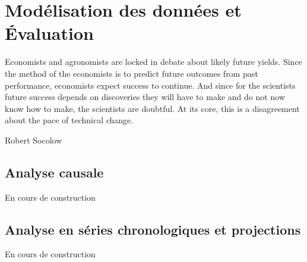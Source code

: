 \chapter{Modélisation des données et Évaluation}
\epigraph{Economists and agronomists are locked in debate about likely
future yields. Since the method of the economists is to predict
future outcomes from past performance, economists expect
success to continue. And since for the scientists future success
depends on discoveries they will have to make and do not now
know how to make, the scientists are doubtful. At its core, this is
a disagreement about the pace of technical change.}{Robert
Socolow}
\cleardoublepage

	\section{Analyse causale}
	\begin{Huge}{ En cours de construction}
		\end{Huge}
	\section{Analyse en séries chronologiques et projections}
	\begin{Huge}{ En cours de construction}
		\end{Huge}